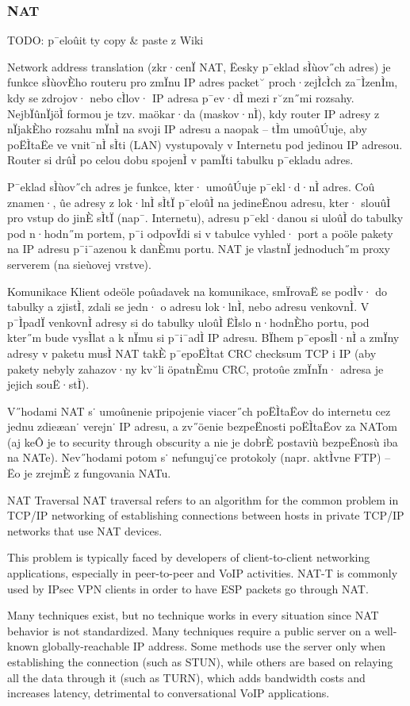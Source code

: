 \subsubsection*{NAT}

TODO: p¯eloûit ty copy \& paste z Wiki

Network address translation (zkr·cenÏ NAT, Ëesky p¯eklad sÌùov˝ch adres) je funkce sÌùovÈho routeru pro zmÏnu IP adres packet˘ proch·zejÌcÌch za¯ÌzenÌm, kdy se zdrojov· nebo cÌlov· IP adresa p¯ev·dÌ mezi r˘zn˝mi rozsahy. NejbÏûnÏjöÌ formou je tzv. maökar·da (maskov·nÌ), kdy router IP adresy z nÏjakÈho rozsahu mÏnÌ na svoji IP adresu a naopak -- tÌm umoûÚuje, aby poËÌtaËe ve vnit¯nÌ sÌti (LAN) vystupovaly v Internetu pod jedinou IP adresou. Router si drûÌ po celou dobu spojenÌ v pamÏti tabulku p¯ekladu adres.

P¯eklad sÌùov˝ch adres je funkce, kter· umoûÚuje p¯ekl·d·nÌ adres. Coû znamen·, ûe adresy z lok·lnÌ sÌtÏ p¯eloûÌ na jedineËnou adresu, kter· slouûÌ pro vstup do jinÈ sÌtÏ (nap¯. Internetu), adresu p¯ekl·danou si uloûÌ do tabulky pod n·hodn˝m portem, p¯i odpovÏdi si v tabulce vyhled· port a poöle pakety na IP adresu p¯i¯azenou k danÈmu portu. NAT je vlastnÏ jednoduch˝m proxy serverem (na sieùovej vrstve).

\medskip
\begin{obecne}{Komunikace}
Klient odeöle poûadavek na komunikace, smÏrovaË se podÌv· do tabulky a zjistÌ, zdali se jedn· o adresu lok·lnÌ, nebo adresu venkovnÌ. V p¯ÌpadÏ venkovnÌ adresy si do tabulky uloûÌ ËÌslo n·hodnÈho portu, pod kter˝m bude vysÌlat a k nÏmu si p¯i¯adÌ IP adresu. BÏhem p¯eposÌl·nÌ  a zmÏny adresy v paketu musÌ NAT takÈ p¯epoËÌtat CRC checksum TCP i IP (aby pakety nebyly zahazov·ny kv˘li öpatnÈmu CRC, protoûe zmÏnÏn· adresa je jejich souË·stÌ).

V˝hodami NAT s˙ umoûnenie pripojenie viacer˝ch poËÌtaËov do internetu cez jednu zdieæan˙ verejn˙ IP adresu, a zv˝öenie bezpeËnosti poËÌtaËov za NATom (aj keÔ je to security through obscurity a nie je dobrÈ postaviù bezpeËnosù iba na NATe). Nev˝hodami potom s˙ nefunguj˙ce protokoly (napr. aktÌvne FTP) -- Ëo je zrejmÈ z fungovania NATu.
\end{obecne}

\begin{obecne}{NAT Traversal}
NAT traversal refers to an algorithm for the common problem in TCP/IP networking of establishing connections between hosts in private TCP/IP networks that use NAT devices.

This problem is typically faced by developers of client-to-client networking applications, especially in peer-to-peer and VoIP activities. NAT-T is commonly used by IPsec VPN clients in order to have ESP packets go through NAT.

Many techniques exist, but no technique works in every situation since NAT behavior is not standardized. Many techniques require a public server on a well-known globally-reachable IP address. Some methods use the server only when establishing the connection (such as STUN), while others are based on relaying all the data through it (such as TURN), which adds bandwidth costs and increases latency, detrimental to conversational VoIP applications.
\end{obecne}

